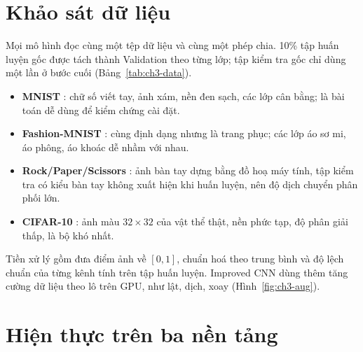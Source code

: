 
\section{Khảo sát dữ liệu}\label{sec:cnn-data}
Mọi mô hình đọc cùng một tệp dữ liệu và cùng một phép chia. 10\% tập huấn luyện gốc được tách thành Validation theo từng lớp; tập kiểm tra gốc chỉ dùng một lần ở bước cuối (Bảng~\ref{tab:ch3-data}).


\begin{itemize}
  \item \textbf{MNIST} \cite{ch1:lecun1998}: chữ số viết tay, ảnh xám, nền đen sạch, các lớp cân bằng; là bài toán dễ dùng để kiểm chứng cài đặt.
  \item \textbf{Fashion-MNIST} \cite{ch3:xiao2017}: cùng định dạng nhưng là trang phục; các lớp áo sơ mi, áo phông, áo khoác dễ nhầm với nhau.
  \item \textbf{Rock/Paper/Scissors} \cite{ch3:moroney2019}: ảnh bàn tay dựng bằng đồ hoạ máy tính, tập kiểm tra có kiểu bàn tay không xuất hiện khi huấn luyện, nên độ dịch chuyển phân phối lớn.
  \item \textbf{CIFAR-10} \cite{ch1:krizhevsky2009}: ảnh màu $32\times32$ của vật thể thật, nền phức tạp, độ phân giải thấp, là bộ khó nhất.
\end{itemize}


Tiền xử lý gồm đưa điểm ảnh về $[0,1]$, chuẩn hoá theo trung bình và độ lệch chuẩn của từng kênh tính trên tập huấn luyện. Improved CNN dùng thêm tăng cường dữ liệu theo lô trên GPU, như lật, dịch, xoay (Hình~\ref{fig:ch3-aug}).


\section{Hiện thực trên ba nền tảng}\label{sec:cnn-impl}
